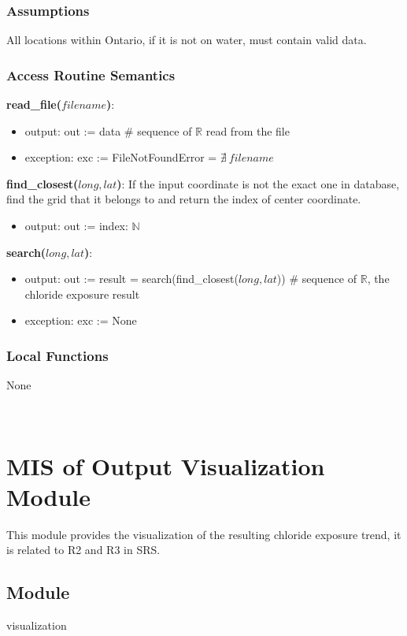 \documentclass[12pt, titlepage]{article}
\begin{document}
\subsubsection{Assumptions}
All locations within Ontario, if it is not on water, must contain valid data. 

\subsubsection{Access Routine Semantics}
\noindent \textbf{read\_file($filename$)}:
\begin{itemize}
\item output: out := data \# sequence of $\mathbb{R}$ read from the file
\item exception: exc := FileNotFoundError = $\nexists ~ filename$
\end{itemize}
\noindent \textbf{find\_closest($long, lat$)}: If the input coordinate is not the exact one in database, find the grid that it belongs to and return the index of center coordinate.
\begin{itemize}
\item output: out := index: $\mathbb{N}$
\end{itemize}
\noindent \textbf{search($long, lat$)}:
\begin{itemize}
\item output: out := result = search(find\_closest($long, lat$)) \# sequence of $\mathbb{R}$, the chloride exposure result
\item exception: exc := None
\end{itemize}

\subsubsection{Local Functions}
None

~\newpage

\section{MIS of Output Visualization Module} \label{outputVisualizationModule}
This module provides the visualization of the resulting chloride exposure trend, it is related to R2 and R3 in SRS.

\subsection{Module}

visualization
\end{document}
